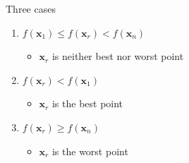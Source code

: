 \documentclass[10pt]{beamer}
\begin{document}
                                                                                              \begin{frame}{Three cases}
                                                                                                \begin{enumerate}
                                                                                                \item $f({\bm x_1})\leq f({\bm x_r})<f({\bm x_n})$
                                                                                                  \begin{itemize}
                                                                                                  \item ${\bm x_r}$ is neither best nor worst point
                                                                                                  \end{itemize}

                                                                                                \item $f({\bm x_r})<f({\bm x_1})$
                                                                                                  \begin{itemize}
                                                                                                  \item ${\bm x_r}$ is the best point
                                                                                                  \end{itemize}

                                                                                                \item $f({\bm x_r})\geq f({\bm x_n})$
                                                                                                  \begin{itemize}
                                                                                                  \item ${\bm x_r}$ is the worst point
                                                                                                  \end{itemize}
                                                                                                \end{enumerate}
                                                                                              \end{frame}
\end{document}
